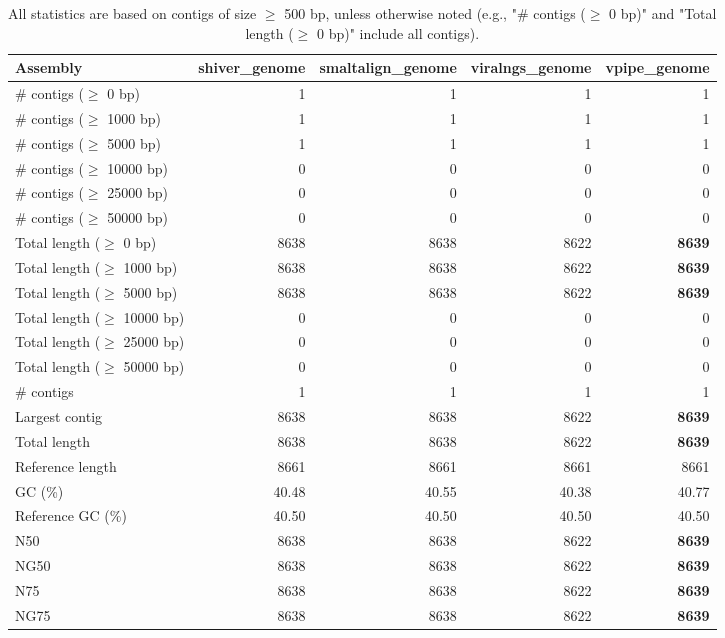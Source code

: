 \documentclass[12pt,a4paper]{article}
\begin{document}
\begin{table}[ht]
\begin{center}
\caption{All statistics are based on contigs of size $\geq$ 500 bp, unless otherwise noted (e.g., "\# contigs ($\geq$ 0 bp)" and "Total length ($\geq$ 0 bp)" include all contigs).}
\begin{tabular}{|l*{4}{|r}|}
\hline
Assembly & shiver\_genome & smaltalign\_genome & viralngs\_genome & vpipe\_genome \\ \hline
\# contigs ($\geq$ 0 bp) & 1 & 1 & 1 & 1 \\ \hline
\# contigs ($\geq$ 1000 bp) & 1 & 1 & 1 & 1 \\ \hline
\# contigs ($\geq$ 5000 bp) & 1 & 1 & 1 & 1 \\ \hline
\# contigs ($\geq$ 10000 bp) & 0 & 0 & 0 & 0 \\ \hline
\# contigs ($\geq$ 25000 bp) & 0 & 0 & 0 & 0 \\ \hline
\# contigs ($\geq$ 50000 bp) & 0 & 0 & 0 & 0 \\ \hline
Total length ($\geq$ 0 bp) & 8638 & 8638 & 8622 & {\bf 8639} \\ \hline
Total length ($\geq$ 1000 bp) & 8638 & 8638 & 8622 & {\bf 8639} \\ \hline
Total length ($\geq$ 5000 bp) & 8638 & 8638 & 8622 & {\bf 8639} \\ \hline
Total length ($\geq$ 10000 bp) & 0 & 0 & 0 & 0 \\ \hline
Total length ($\geq$ 25000 bp) & 0 & 0 & 0 & 0 \\ \hline
Total length ($\geq$ 50000 bp) & 0 & 0 & 0 & 0 \\ \hline
\# contigs & 1 & 1 & 1 & 1 \\ \hline
Largest contig & 8638 & 8638 & 8622 & {\bf 8639} \\ \hline
Total length & 8638 & 8638 & 8622 & {\bf 8639} \\ \hline
Reference length & 8661 & 8661 & 8661 & 8661 \\ \hline
GC (\%) & 40.48 & 40.55 & 40.38 & 40.77 \\ \hline
Reference GC (\%) & 40.50 & 40.50 & 40.50 & 40.50 \\ \hline
N50 & 8638 & 8638 & 8622 & {\bf 8639} \\ \hline
NG50 & 8638 & 8638 & 8622 & {\bf 8639} \\ \hline
N75 & 8638 & 8638 & 8622 & {\bf 8639} \\ \hline
NG75 & 8638 & 8638 & 8622 & {\bf 8639} \\ \hline

\end{tabular}
\end{center}
\end{table}
\end{document}
